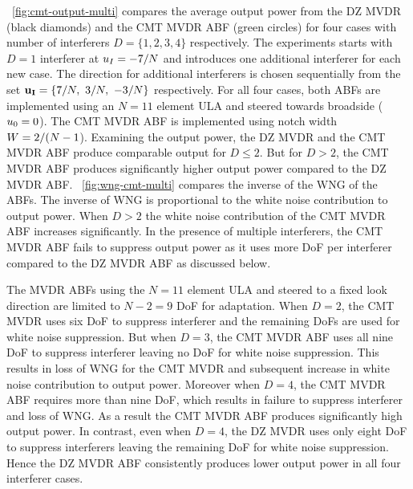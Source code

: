 \figurename{}~\ref{fig:cmt-output-multi} compares the average output
power from the DZ MVDR (black diamonds) and the CMT MVDR ABF (green
circles) for four cases with number of interferers
$D = \lbrace 1, 2, 3, 4 \rbrace$ respectively. The experiments starts
with $D = 1$ interferer at $u_I = -7/N$ and introduces one
additional interferer for each new case. The direction for additional
interferers is chosen sequentially from the set
$\mathbf{u_I} = \lbrace 7/N,~3/N,~-3/N \rbrace$ respectively. For
all four cases, both ABFs are implemented using an $N = 11$ element
ULA and steered towards broadside ($u_0 = 0$). The CMT MVDR ABF is
implemented using notch width $W = 2/(N - 1$).  Examining the
output power, the DZ MVDR and the CMT MVDR ABF produce comparable
output for $ D \leq 2$. But for $D > 2$, the CMT MVDR ABF produces
significantly higher output power compared to the DZ MVDR ABF.
\figurename{}~\ref{fig:wng-cmt-multi} compares the inverse of the WNG
of the ABFs.  The inverse of WNG is proportional to the white noise
contribution to output power. When $D > 2$ the white noise
contribution of the CMT MVDR ABF increases significantly. In the
presence of multiple interferers, the CMT MVDR ABF fails to suppress
output power as it uses more DoF per interferer compared to the DZ
MVDR ABF as discussed below.

The MVDR ABFs using the $N = 11$ element ULA and steered to a fixed
look direction are limited to $N-2 = 9$ DoF for adaptation. When
$D = 2$, the CMT MVDR uses six DoF to suppress interferer and the
remaining DoFs are used for white noise suppression. But when $D = 3$,
the CMT MVDR ABF uses all nine DoF to suppress interferer leaving no
DoF for white noise suppression. This results in loss of WNG for the
CMT MVDR and subsequent increase in white noise contribution to output
power. Moreover when $D = 4$, the CMT MVDR ABF requires more than nine
DoF, which results in failure to suppress interferer and loss of
WNG. As a result the CMT MVDR ABF produces significantly high output
power. In contrast, even when $ D = 4$, the DZ MVDR uses only eight
DoF to suppress interferers leaving the remaining DoF for white noise
suppression. Hence the DZ MVDR ABF consistently produces lower output
power in all four interferer cases.

